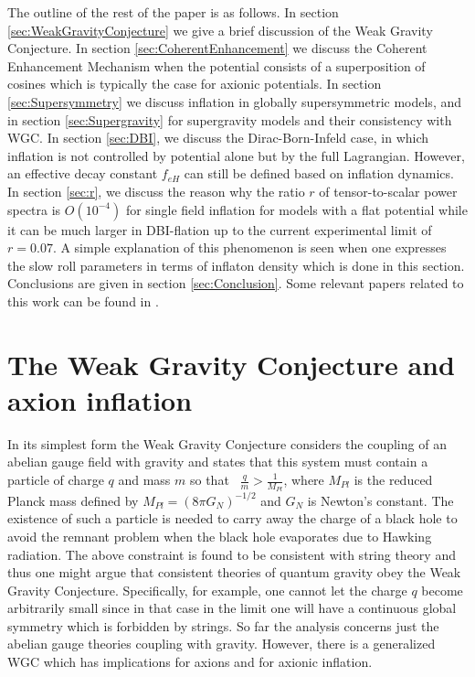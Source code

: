 \documentclass[12pt]{article}
\begin{document}
The outline of the rest of the paper is as follows.
In section \ref{sec:WeakGravityConjecture} we give a brief discussion of the Weak Gravity Conjecture.
In section \ref{sec:CoherentEnhancement} we discuss the Coherent Enhancement Mechanism when the potential consists of a superposition of cosines which is typically the case for axionic potentials.
In section \ref{sec:Supersymmetry} we discuss inflation in globally supersymmetric models, and in section \ref{sec:Supergravity} for supergravity models and their consistency with WGC.
In section \ref{sec:DBI}, we discuss the Dirac-Born-Infeld case, in which inflation is not controlled by potential alone but by the full Lagrangian.
However, an effective decay constant $f_{eH}$ can still be defined based on inflation dynamics.
In section \ref{sec:r}, we discuss the reason why the ratio $r$ of tensor-to-scalar power spectra is $O\left(10^{-4}\right)$ for single field inflation for models with a flat potential while it can be much larger in DBI-flation up to the current experimental limit of $r = 0.07$.
A simple explanation of this phenomenon is seen when one expresses the slow roll parameters in terms of inflaton density which is
done in this section.
Conclusions are given in section \ref{sec:Conclusion}.
Some relevant papers related to this work can be found in \cite{BlancoPillado:2006he, Conlon:2005jm, Ben-Dayan:2014lca, Gao:2014uha}.

\section{The Weak Gravity Conjecture and axion inflation \label{sec:WeakGravityConjecture}}
In its simplest form the Weak Gravity Conjecture considers the coupling of an abelian gauge field with gravity and states that this system must contain a particle of charge $q$ and mass $m$ so that~\cite{ArkaniHamed:2006dz} $\frac{q}{m} > \frac{1}{M_{Pl}}$, where $M_{Pl}$ is the reduced Planck mass defined by $M_{Pl} = \left(8 \pi G_N\right)^{-1 / 2}$ and $G_N$ is Newton's constant.
The existence of such a particle is needed to carry away the charge of a black hole to avoid the remnant problem when the black hole evaporates due to Hawking radiation.
The above constraint is found to be consistent with string theory and thus one might argue that consistent theories of quantum gravity obey the Weak Gravity Conjecture.
Specifically, for example, one cannot let the charge $q$ become arbitrarily small since in that case in the limit one will have a continuous global symmetry which is forbidden by strings.
So far the analysis concerns just the abelian gauge theories coupling with gravity.
However, there is a generalized WGC which has implications for axions and for axionic inflation.
\end{document}
